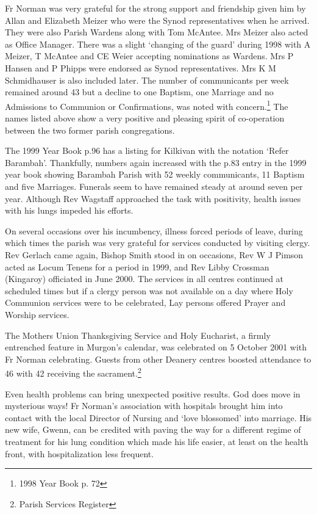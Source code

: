 Fr Norman was very grateful for the strong support and friendship given him by Allan and Elizabeth Meizer who were the Synod representatives when he arrived. They were also Parish Wardens along with Tom McAntee. Mrs Meizer also acted as Office Manager. There was a slight `changing of the guard' during 1998 with A Meizer, T McAntee and CE Weier accepting nominations as Wardens. Mrs P Hansen and P Phipps were endorsed as Synod representatives. Mrs K M Schmidhauser is also included later. The number of communicants per week remained around 43 but a decline to one Baptism, one Marriage and no Admissions to Communion or Confirmations, was noted with concern.\footnote{1998 Year Book p. 72} The names listed above show a very positive and pleasing spirit of co-operation between the two former parish congregations.

The 1999 Year Book p.96 has a listing for Kilkivan with the notation `Refer Barambah'. Thankfully, numbers again increased with the p.83 entry in the 1999 year book showing Barambah Parish with 52 weekly communicants, 11 Baptism and five Marriages. Funerals seem to have remained steady at around seven per year. Although Rev Wagstaff approached the task with positivity, health issues with his lungs impeded his efforts.

On several occasions over his incumbency, illness forced periods of leave, during which times the parish was very grateful for services conducted by visiting clergy. Rev Gerlach came again, Bishop Smith stood in on occasions, Rev W J Pimson acted as Locum Tenens for a period in 1999, and Rev Libby Crossman (Kingaroy) officiated in June 2000. The services in all centres continued at scheduled times but if a clergy person was not available on a day where Holy Communion services were to be celebrated, Lay persons offered Prayer and Worship services.

The Mothers Union Thanksgiving Service and Holy Eucharist, a firmly entrenched feature in Murgon's calendar, was celebrated on 5 October 2001 with Fr Norman celebrating. Guests from other Deanery centres boosted attendance to 46 with 42 receiving the sacrament.\footnote{Parish Services Register}

Even health problems can bring unexpected positive results. God does move in mysterious ways! Fr Norman's association with hospitals brought him into contact with the local Director of Nursing and `love blossomed' into marriage. His new wife, Gwenn, can be credited with paving the way for a different regime of treatment for his lung condition which made his life easier, at least on the health front, with hospitalization less frequent.

